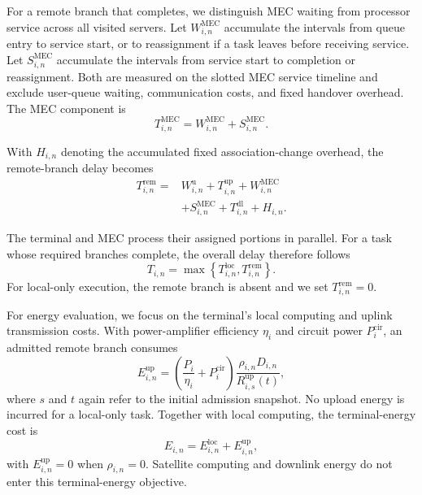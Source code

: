\documentclass[journal]{IEEEtran}
\begin{document}
For a remote branch that completes, we distinguish
MEC waiting from processor service across all visited
servers. Let $W^{\mathrm{MEC}}_{i,n}$ accumulate the
intervals from queue entry to service start, or to
reassignment if a task leaves before receiving service.
Let $S^{\mathrm{MEC}}_{i,n}$ accumulate the intervals
from service start to completion or reassignment.
Both are measured on the slotted MEC service timeline
and exclude user-queue waiting, communication costs,
and fixed handover overhead. The MEC component is
\begin{equation}
T^{\mathrm{MEC}}_{i,n}
=
W^{\mathrm{MEC}}_{i,n}
+
S^{\mathrm{MEC}}_{i,n}.
\label{eq:mec_residence}
\end{equation}

With $H_{i,n}$ denoting the accumulated fixed
association-change overhead, the remote-branch delay
becomes
\begin{equation}
\begin{aligned}
T^{\mathrm{rem}}_{i,n}
={}&W^{\mathrm u}_{i,n}
+T^{\mathrm{up}}_{i,n}
+W^{\mathrm{MEC}}_{i,n}\\
&+S^{\mathrm{MEC}}_{i,n}
+T^{\mathrm{dl}}_{i,n}
+H_{i,n}.
\end{aligned}
\label{eq:remote_delay}
\end{equation}

The terminal and MEC process their assigned portions
in parallel. For a task whose required branches complete,
the overall delay therefore follows
\begin{equation}
T_{i,n}=
\max\left\{
T^{\mathrm{loc}}_{i,n},
T^{\mathrm{rem}}_{i,n}
\right\}.
\label{eq:task_delay}
\end{equation}
For local-only execution, the remote branch is absent
and we set $T^{\mathrm{rem}}_{i,n}=0$.

For energy evaluation, we focus on the terminal's
local computing and uplink transmission costs.
With power-amplifier efficiency $\eta_i$ and circuit
power $P_i^{\mathrm{cir}}$, an admitted remote branch
consumes
\begin{equation}
E^{\mathrm{up}}_{i,n}=
\left(\frac{P_i}{\eta_i}+P_i^{\mathrm{cir}}\right)
\frac{\rho_{i,n}D_{i,n}}
{R^{\mathrm{up}}_{i,s}(t)},
\label{eq:upload_energy}
\end{equation}
where $s$ and $t$ again refer to the initial admission
snapshot. No upload energy is incurred for a local-only
task. Together with local computing, the terminal-energy
cost is
\begin{equation}
E_{i,n}=E^{\mathrm{loc}}_{i,n}+E^{\mathrm{up}}_{i,n},
\label{eq:task_energy}
\end{equation}
with $E^{\mathrm{up}}_{i,n}=0$ when $\rho_{i,n}=0$.
Satellite computing and downlink energy do not enter
this terminal-energy objective.
\end{document}
